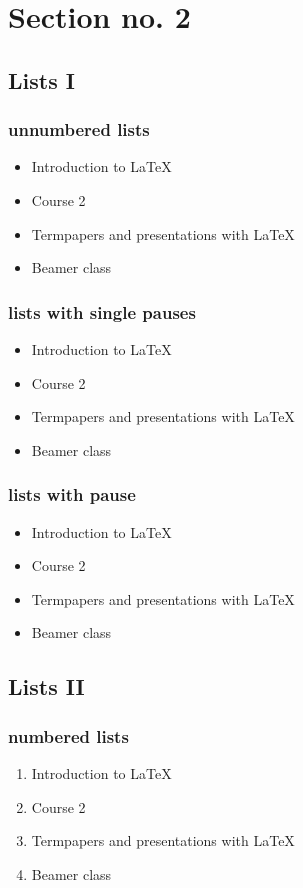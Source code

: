 \documentclass[hyperref={pdfpagelabels=false}]{beamer}
\begin{document}
\section{Section no. 2} 
\subsection{Lists I}
\begin{frame}
\frametitle{unnumbered lists}
\begin{itemize}
\item Introduction to  \LaTeX{}  
\item Course 2 
\item Termpapers and presentations with \LaTeX{}  
\item Beamer class
\end{itemize} 
\end{frame}

\begin{frame}\frametitle{lists with single pauses}
\begin{itemize}
\item Introduction to  \LaTeX{}  \pause 
\item Course 2 \pause 
\item Termpapers and presentations with \LaTeX{}  \pause 
\item Beamer class
\end{itemize} 
\end{frame}

\begin{frame}\frametitle{lists with pause}
\begin{itemize}[<+->]
\item Introduction to  \LaTeX{}  
\item Course 2
\item Termpapers and presentations with \LaTeX{}  
\item Beamer class
\end{itemize} 
\end{frame}



\subsection{Lists II}
\begin{frame}\frametitle{numbered lists}
\begin{enumerate}
\item Introduction to  \LaTeX{}   
\item Course 2 
\item Termpapers and presentations with \LaTeX{}  
\item Beamer class
\end{enumerate}
\end{frame}
\end{document}
